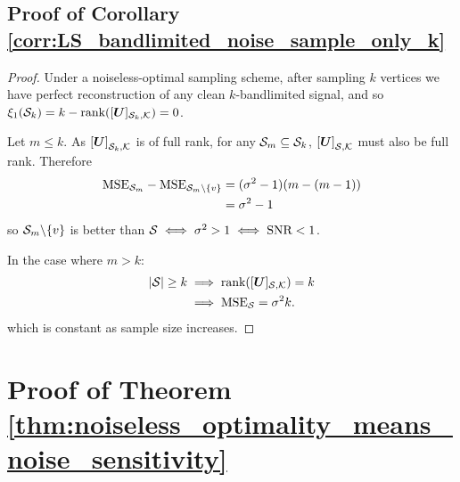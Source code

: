 \subsection{Proof of Corollary \ref{corr:LS_bandlimited_noise_sample_only_k}}
\begin{proof}
    Under a noiseless-optimal sampling scheme, after sampling $k$ vertices we have perfect reconstruction of any clean $k$-bandlimited signal, and so $\xi_{1}(\mathcal{S}_{k}) = k - \textrm{rank}([\bm{U}]_{\mathcal{S}_{k},\mathcal{K}}) = 0$. 
    
    Let $m \leq k$. As $\msubgen[\set{S}_{k},\set{K}]{\matr{U}}$ is of full rank, for any $\mathcal{S}_{m} \subseteq \mathcal{S}_{k}$, $\msubgen[\set{S},\set{K}]{\matr{U}}$ must also be full rank.
    Therefore
    \begin{align}
        \textrm{MSE}_{\mathcal{S}_{m}} - \textrm{MSE}_{\mathcal{S}_{m} \backslash \{v\}} &= (\sigma^{2} - 1)(m - (m-1)) \\
        &= \sigma^{2} - 1
    \end{align}
    so $\mathcal{S}_{m} \backslash \{v\}$ is better than $\mathcal{S} \iff \sigma^{2} > 1 \iff \textrm{SNR} < 1$.
    
    In the case where $m > k$:
    \begin{align}
        |\mathcal{S}| \geq k &\implies \textrm{rank}([\bm{U}]_{\mathcal{S},\mathcal{K}}) = k \\
        &\implies \mathrm{MSE}_{\mathcal{S}} = \sigma^{2}k.
    \end{align}
    which is constant as sample size increases.
\end{proof}

\section{Proof of Theorem \ref{thm:noiseless_optimality_means_noise_sensitivity}}
\label{app:optimal_noiseless_schemes_immediately_satisfy}
